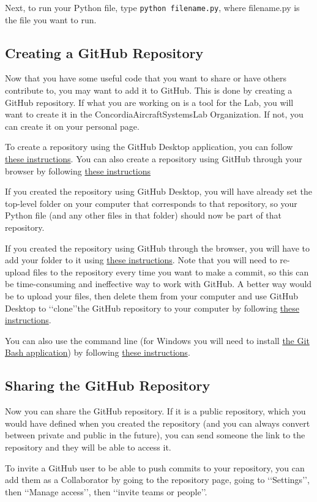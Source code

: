 \documentclass[letterpaper, 12pt]{article}
\begin{document}
Next, to run your Python file, type \lstinline{python filename.py}, where filename.py is the file you want to run. 

\subsection{Creating a GitHub Repository}
Now that you have some useful code that you want to share or have others contribute to, you may want to add it to GitHub. This is done by creating a GitHub repository. If what you are working on is a tool for the Lab, you will want to create it in the ConcordiaAircraftSystemsLab Organization. If not, you can create it on your personal page.

To create a repository using the GitHub Desktop application, you can follow \href{https://help.github.com/en/desktop/getting-started-with-github-desktop/creating-your-first-repository-using-github-desktop}{these instructions}. You can also create a repository using GitHub through your browser by following \href{https://help.github.com/en/github/getting-started-with-github/create-a-repo}{these instructions}

If you created the repository using GitHub Desktop, you will have already set the top-level folder on your computer that corresponds to that repository, so your Python file (and any other files in that folder) should now be part of that repository.

If you created the repository using GitHub through the browser, you will have to add your folder to it using \href{https://help.github.com/en/github/managing-files-in-a-repository/adding-a-file-to-a-repository}{these instructions}. Note that you will need to re-upload files to the repository every time you want to make a commit, so this can be time-consuming and ineffective way to work with GitHub. A better way would be to upload your files, then delete them from your computer and use GitHub Desktop to \lq\lq clone\rq\rq the GitHub repository to your computer by following \href{https://help.github.com/en/desktop/contributing-to-projects/cloning-and-forking-repositories-from-github-desktop}{these instructions}.

You can also use the command line (for Windows you will need to install \href{https://gitforwindows.org/}{the Git Bash application}) by following \href{https://help.github.com/en/github/importing-your-projects-to-github/adding-an-existing-project-to-github-using-the-command-line}{these instructions}.

\subsection{Sharing the GitHub Repository}
Now you can share the GitHub repository. If it is a public repository, which you would have defined when you created the repository (and you can always convert between private and public in the future), you can send someone the link to the repository and they will be able to access it.

To invite a GitHub user to be able to push commits to your repository, you can add them as a Collaborator by going to the repository page, going to \lq\lq Settings\rq\rq, then \lq\lq Manage access\rq\rq, then \lq\lq invite teams or people\rq\rq.
\end{document}
